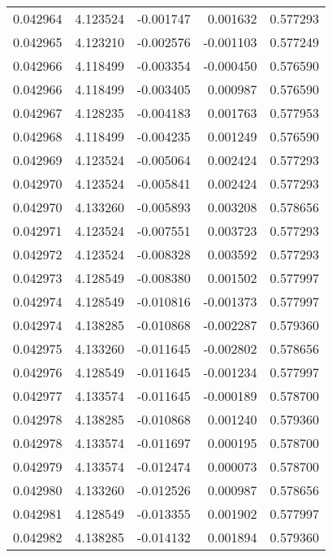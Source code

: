 \begin{tabular}{lrrrr}
0.042964    &  4.123524 & -0.001747 &  0.001632 &             0.577293 \\
0.042965    &  4.123210 & -0.002576 & -0.001103 &             0.577249 \\
0.042966    &  4.118499 & -0.003354 & -0.000450 &             0.576590 \\
0.042966    &  4.118499 & -0.003405 &  0.000987 &             0.576590 \\
0.042967    &  4.128235 & -0.004183 &  0.001763 &             0.577953 \\
0.042968    &  4.118499 & -0.004235 &  0.001249 &             0.576590 \\
0.042969    &  4.123524 & -0.005064 &  0.002424 &             0.577293 \\
0.042970    &  4.123524 & -0.005841 &  0.002424 &             0.577293 \\
0.042970    &  4.133260 & -0.005893 &  0.003208 &             0.578656 \\
0.042971    &  4.123524 & -0.007551 &  0.003723 &             0.577293 \\
0.042972    &  4.123524 & -0.008328 &  0.003592 &             0.577293 \\
0.042973    &  4.128549 & -0.008380 &  0.001502 &             0.577997 \\
0.042974    &  4.128549 & -0.010816 & -0.001373 &             0.577997 \\
0.042974    &  4.138285 & -0.010868 & -0.002287 &             0.579360 \\
0.042975    &  4.133260 & -0.011645 & -0.002802 &             0.578656 \\
0.042976    &  4.128549 & -0.011645 & -0.001234 &             0.577997 \\
0.042977    &  4.133574 & -0.011645 & -0.000189 &             0.578700 \\
0.042978    &  4.138285 & -0.010868 &  0.001240 &             0.579360 \\
0.042978    &  4.133574 & -0.011697 &  0.000195 &             0.578700 \\
0.042979    &  4.133574 & -0.012474 &  0.000073 &             0.578700 \\
0.042980    &  4.133260 & -0.012526 &  0.000987 &             0.578656 \\
0.042981    &  4.128549 & -0.013355 &  0.001902 &             0.577997 \\
0.042982    &  4.138285 & -0.014132 &  0.001894 &             0.579360 \\

\end{tabular}
